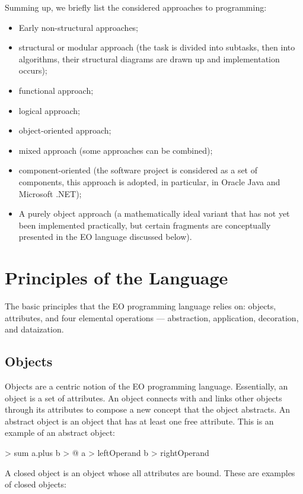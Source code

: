 \documentclass[12pt]{book}
\begin{document}
Summing up, we briefly list the considered approaches to programming:
\begin{itemize}
    \item Early non-structural approaches;
    \item structural or modular approach (the task is divided into subtasks, then into algorithms, their structural diagrams are drawn up and implementation occurs);
    \item functional  approach;
    \item logical approach;
    \item object-oriented approach;
    \item mixed approach (some approaches can be combined);
    \item component-oriented (the software project is considered as a set of components, this approach is adopted, in particular, in Oracle Java and Microsoft .NET);
    \item A purely object approach (a mathematically ideal variant that has not yet been implemented practically, but certain fragments are conceptually presented in the EO language discussed below).
\end{itemize}


\chapter{Principles of the Language}

The basic principles that the EO programming language relies on: objects, attributes, and four elemental operations — abstraction, application, decoration, and dataization.

\section{Objects}
Objects are a centric notion of the EO programming language. Essentially, an object is a set of attributes. An object connects with and links other objects through its attributes to compose a new concept that the object abstracts.
An abstract object is an object that has at least one free attribute.
This is an example of an abstract object:

\begin{ffcode}
[a b] > sum
  a.plus b > @
  a > leftOperand
  b > rightOperand
\end{ffcode}
A closed object is an object whose all attributes are bound.
These are examples of closed objects:

\end{document}
